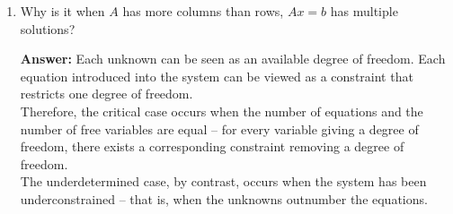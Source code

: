 \documentclass{article}
\newenvironment{QandA}{\begin{enumerate}[label=\arabic*.]}{\end{enumerate}}
\newenvironment{InnerQandA}{\begin{enumerate}[label=\roman*.]}{\end{enumerate}}
\newenvironment{answer}{\par\normalfont \textbf{Answer:}}{}
\begin{document}
\begin{QandA}
\begin{InnerQandA}
        \item Why is it when $A$ has more columns than rows,  $Ax=b$ has multiple solutions?
        \begin{answer}
            Each unknown can be seen as an available degree of freedom. Each equation introduced into the system can be viewed as a constraint that restricts one degree of freedom. \\
            Therefore, the critical case occurs when the number of equations and the number of free variables are equal -- for every variable giving a degree of freedom, there exists a corresponding constraint removing a degree of freedom. \\
            The underdetermined case, by contrast, occurs when the system has been underconstrained  -- that is, when the unknowns outnumber the equations.
        \end{answer}
        

\end{InnerQandA}
\end{QandA}
\end{document}
